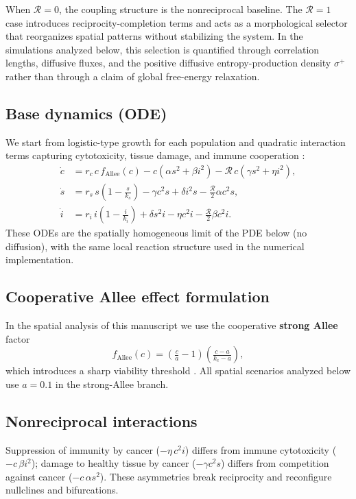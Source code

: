 When $\mathcal{R}=0$, the coupling structure is the nonreciprocal baseline. The $\mathcal{R}=1$ case introduces reciprocity-completion terms and acts as a morphological selector that reorganizes spatial patterns without stabilizing the system. In the simulations analyzed below, this selection is quantified through correlation lengths, diffusive fluxes, and the positive diffusive entropy-production density $\sigma^+$ rather than through a claim of global free-energy relaxation.

\subsection{Base dynamics (ODE)}
We start from logistic-type growth for each population and quadratic interaction terms capturing cytotoxicity, tissue damage, and immune cooperation \cite{delitala2007}:
\begin{align}
\dot{c} &= r_c\, c\, f_{\text{Allee}}(c) - c(\alpha s^2 + \beta i^2) - \mathcal{R}\, c(\gamma s^2 + \eta i^2), \\
\dot{s} &= r_s\, s \left(1-\tfrac{s}{k_s}\right) - \gamma c^2 s + \delta i^2 s - \tfrac{\mathcal{R}}{2}\alpha c^2 s, \\
\dot{i} &= r_i\, i \left(1-\tfrac{i}{k_i}\right) + \delta s^2 i - \eta c^2 i - \tfrac{\mathcal{R}}{2}\beta c^2 i .
\end{align}
These ODEs are the spatially homogeneous limit of the PDE below (no diffusion), with the same local reaction structure used in the numerical implementation.

\subsection{Cooperative Allee effect formulation}
In the spatial analysis of this manuscript we use the cooperative \textbf{strong Allee} factor
\begin{equation}
    f_{\text{Allee}}(c)=\left(\tfrac{c}{a}-1\right)\left(\tfrac{c-a}{k_c-a}\right),
    \label{eq:strong-allee-model}
\end{equation}
which introduces a sharp viability threshold \cite{gerlee2022,bottger2015}. All spatial scenarios analyzed below use $a=0.1$ in the strong-Allee branch.

\subsection{Nonreciprocal interactions}
Suppression of immunity by cancer ($-\eta\,c^2 i$) differs from immune cytotoxicity ($-c\,\beta i^2$); damage to healthy tissue by cancer ($-\gamma c^2 s$) differs from competition against cancer ($-c\,\alpha s^2$). These asymmetries break reciprocity and reconfigure nullclines and bifurcations.

